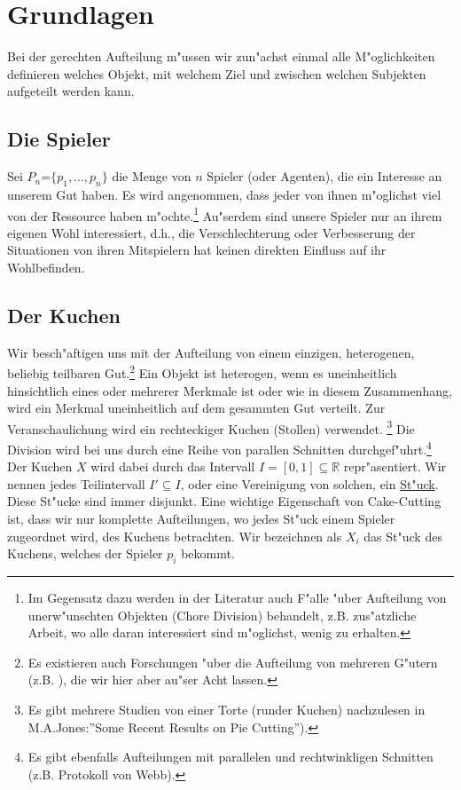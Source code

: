 \documentclass[11pt, a4paper, twoside]{article}
\numberwithin{equation}{section}
\begin{document}
\section{Grundlagen}
Bei der gerechten Aufteilung m"ussen wir zun"achst einmal alle M"oglichkeiten definieren welches Objekt, mit welchem Ziel und zwischen welchen Subjekten aufgeteilt werden kann.
\subsection{Die Spieler}
Sei $P_n$=$\{p_1,...,p_n\}$ die Menge von $n$ Spieler (oder Agenten), die ein Interesse an unserem Gut haben. Es wird angenommen, dass jeder von ihnen m"oglichst viel von der Ressource haben m"ochte.\footnote{Im Gegensatz dazu werden in der Literatur auch F"alle "uber Aufteilung von unerw"unschten Objekten (Chore Division) behandelt, z.B. zus"atzliche Arbeit, wo alle daran interessiert sind m"oglichst, wenig zu erhalten.} Au"serdem sind unsere Spieler nur an ihrem eigenen Wohl interessiert, d.h., die Verschlechterung oder Verbesserung der Situationen von ihren Mitspielern hat keinen direkten Einfluss auf ihr Wohlbefinden.
\subsection{Der Kuchen}
Wir besch"aftigen uns mit der Aufteilung von einem einzigen, heterogenen, beliebig teilbaren Gut.\footnote{Es existieren auch Forschungen "uber die Aufteilung von mehreren G"utern (z.B. \cite{1}), die wir hier aber au"ser Acht lassen.} Ein Objekt ist heterogen, wenn es uneinheitlich hinsichtlich eines oder mehrerer Merkmale ist oder wie in diesem Zusammenhang, wird ein Merkmal uneinheitlich auf dem gesammten Gut verteilt. Zur Veranschaulichung wird ein rechteckiger Kuchen (Stollen) verwendet. \footnote{Es gibt mehrere Studien von einer Torte (runder Kuchen) nachzulesen in M.A.Jones:''Some Recent Results on Pie Cutting'').} Die Division wird bei uns durch eine Reihe von parallen Schnitten durchgef"uhrt.\footnote{Es gibt ebenfalls Aufteilungen mit parallelen und rechtwinkligen Schnitten (z.B. Protokoll von Webb).} Der Kuchen $X$ wird dabei durch das Intervall $I=[0,1]\subseteq \mathbb{R}$ repr"asentiert. Wir nennen jedes Teilintervall $I'\subseteq I$, oder eine Vereinigung von solchen, ein \underline{St"uck}. Diese St"ucke sind immer disjunkt. Eine wichtige Eigenschaft von Cake-Cutting ist, dass wir nur komplette Aufteilungen, wo jedes St"uck einem Spieler zugeordnet wird, des Kuchens betrachten. Wir bezeichnen als $X_i$ das St"uck des Kuchens, welches der Spieler $p_i$ bekommt.
\end{document}
